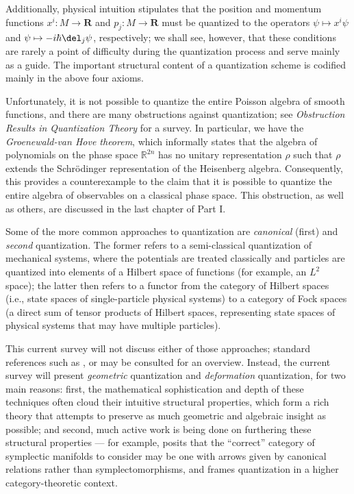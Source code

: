 Additionally, physical intuition stipulates that the position and momentum functions $x^i: M \to \mathbf{R}$ and $p_j: M \to \mathbf{R}$ must be quantized to the operators $\psi \mapsto x^i\psi$ and $\psi \mapsto -i\hbar\del_j\psi$, respectively; we shall see, however, that these conditions are rarely a point of difficulty during the quantization process and serve mainly as a guide. The important structural content of a quantization scheme is codified mainly in the above four axioms.

Unfortunately, it is not possible to quantize the entire Poisson algebra of smooth functions, and there are many obstructions against quantization; see \emph{Obstruction Results in Quantization Theory} \cite{gotay} for a survey. In particular, we have the \emph{Groenewald-van Hove theorem}, which informally states that the algebra of polynomials on the phase space $\mathbb{R}^{2n}$ has no unitary representation $\rho$ such that $\rho$ extends the Schr\"{o}dinger representation of the Heisenberg algebra. Consequently, this provides a counterexample to the claim that it is possible to quantize the entire algebra of observables on a classical phase space. This obstruction, as well as others, are discussed in the last chapter of Part I.

Some of the more common approaches to quantization are \emph{canonical} (first) and \emph{second} quantization. The former refers to a semi-classical quantization of mechanical systems, where the potentials are treated classically and particles are quantized into elements of a Hilbert space of functions (for example, an $L^2$ space); the latter then refers to a functor from the category of Hilbert spaces (i.e., state spaces of single-particle physical systems) to a category of Fock spaces (a direct sum of tensor products of Hilbert spaces, representing state spaces of physical systems that may have multiple particles).

This current survey will not discuss either of those approaches; standard references such as \cite{sakurai}, \cite{reedsimon} or \cite{folland} may be consulted for an overview. Instead, the current survey will present \emph{geometric} quantization and \emph{deformation} quantization, for two main reasons: first, the mathematical sophistication and depth of these techniques often cloud their intuitive structural properties, which form a rich theory that attempts to preserve as much geometric and algebraic insight as possible; and second, much active work is being done on furthering these structural properties --- for example, \cite{weinstein} posits that the ``correct'' category of symplectic manifolds to consider may be one with arrows given by canonical relations rather than symplectomorphisms, and \cite{hawkins} frames quantization in a higher category-theoretic context.

